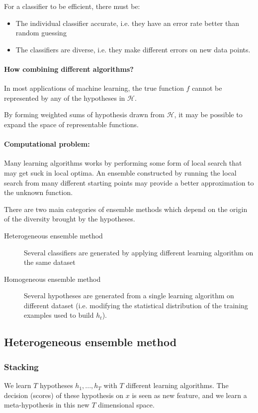 \documentclass{article}
\begin{document}
For a classifier to be efficient, there must be:
\begin{itemize}[noitemsep]
\item The individual classifier accurate, i.e. they have an error rate better than random guessing
\item The classifiers are diverse, i.e. they make different errors on new data points.
\end{itemize}

\paragraph{How combining different algorithms?}
In most applications of machine learning, the true function $f$ cannot be represented by any of the hypotheses in $\mathcal{H}$.

By forming weighted sums of hypothesis drawn from $\mathcal{H}$, it may be possible to expand the space of representable functions.

\paragraph{Computational problem:}
Many learning algorithms works by performing some form of local search that may get suck in local optima. An ensemble constructed by running the local search from many different starting points may provide a better approximation to the unknown function.

There are two main categories of ensemble methods which depend on the origin of the diversity brought by the hypotheses.
\begin{description}
\item[Heterogeneous ensemble method] Several classifiers are generated by applying different learning algorithm on the same dataset
\item[Homogeneous ensemble method] Several hypotheses are generated from a single learning algorithm on different dataset (i.e. modifying the statistical distribution of the training examples used to build $h_t$).
\end{description}

\subsection{Heterogeneous ensemble method}
\subsubsection{Stacking}
We learn $T$ hypotheses $h_1,...,h_T$ with $T$ different learning algorithms. The decision (scores) of these hypothesis on $x$ is seen as new feature, and we learn a meta-hypothesis in this new $T$ dimensional space.
\end{document}
